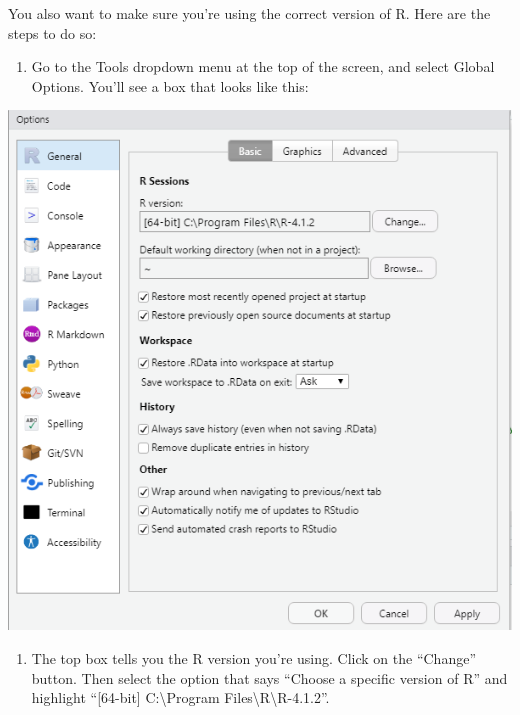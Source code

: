 \documentclass[]{book}
\providecommand{\tightlist}{%
  \setlength{\itemsep}{0pt}\setlength{\parskip}{0pt}}
\begin{document}
You also want to make sure you're using the correct version of R. Here are the steps to do so:

\begin{enumerate}
\def\labelenumi{\arabic{enumi})}
\tightlist
\item
  Go to the Tools dropdown menu at the top of the screen, and select Global Options. You'll see a box that looks like this:
\end{enumerate}

\includegraphics[width=8.18in]{images/options}

\begin{enumerate}
\def\labelenumi{\arabic{enumi})}
\setcounter{enumi}{1}
\tightlist
\item
  The top box tells you the R version you're using. Click on the ``Change'' button. Then select the option that says ``Choose a specific version of R'' and highlight ``[64-bit] C:\textbackslash Program Files\textbackslash R\textbackslash R-4.1.2''.
\end{enumerate}
\end{document}
